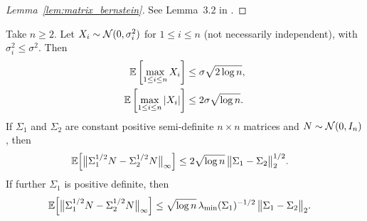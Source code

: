 \begin{proof}[Lemma~\ref{lem:matrix_bernstein}]

  See Lemma~3.2 in \citet{minsker2019moment}.
\end{proof}

\begin{lemma}
  \label{lem:gaussian_vector_maximal}

  Take $n \geq 2$.
  Let $X_i \sim \mathcal{N}(0, \sigma_i^2)$
  for $1 \leq i \leq n$
  (not necessarily independent),
  with $\sigma_i^2 \leq \sigma^2$.
  Then
  \begin{align}
    \label{eq:gaussian_vector_maximal}
    \mathbb{E}\left[
      \max_{1 \leq i \leq n}
      X_i
    \right]
    &\leq
    \sigma \sqrt{2 \log n}, \\
    \label{eq:gaussian_vector_maximal_abs}
    \mathbb{E}\left[
      \max_{1 \leq i \leq n}
      |X_i|
    \right]
    &\leq
    2 \sigma \sqrt{\log n}.
  \end{align}
  If $\Sigma_1$ and $\Sigma_2$ are constant
  positive semi-definite $n \times n$ matrices
  and $N \sim \mathcal{N}(0,I_n)$,
  then
  \begin{align}
    \label{eq:gaussian_difference_psd}
    \mathbb{E}\Big[
      \big\|
      \Sigma_1^{1/2} N
      - \Sigma_2^{1/2} N
      \big\|_\infty
    \Big]
    &\leq
    2 \sqrt{\log n} \,
    \big\|
    \Sigma_1 - \Sigma_2
    \big\|_2^{1/2}.
  \end{align}
  If further $\Sigma_1$ is
  positive definite,
  then
  \begin{align}
    \label{eq:gaussian_difference_pd}
    \mathbb{E}\Big[
      \big\|
      \Sigma_1^{1/2} N
      - \Sigma_2^{1/2} N
      \big\|_\infty
    \Big]
    &\leq
    \sqrt{\log n} \,
    \lambda_{\min}(\Sigma_1)^{-1/2} \,
    \big\|
    \Sigma_1 - \Sigma_2
    \big\|_2.
  \end{align}

\end{lemma}

